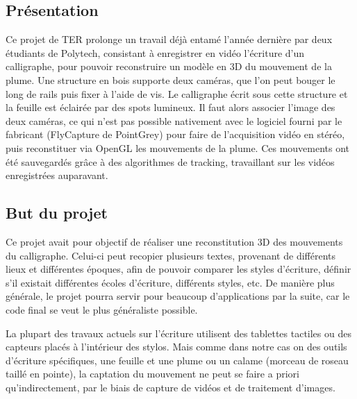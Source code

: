 \subsection{Présentation}

Ce projet de TER prolonge un travail déjà entamé l'année dernière par deux étudiants de Polytech, consistant à enregistrer en vidéo l'écriture d'un calligraphe, pour pouvoir reconstruire un modèle en 3D du mouvement de la plume. Une structure en bois supporte deux caméras, que l'on peut bouger le long de rails puis fixer à l'aide de vis. Le calligraphe écrit sous cette structure et la feuille est éclairée par des spots lumineux. Il faut alors associer l'image des deux caméras, ce qui n'est pas possible nativement avec le logiciel fourni par le fabricant (FlyCapture de PointGrey) pour faire de l'acquisition vidéo en stéréo, puis reconstituer via OpenGL les mouvements de la plume. Ces mouvements ont été sauvegardés grâce à des algorithmes de tracking, travaillant sur les vidéos enregistrées auparavant.



\subsection{But du projet}

Ce projet avait pour objectif de réaliser une reconstitution 3D des mouvements du calligraphe. Celui-ci peut recopier plusieurs textes, provenant de différents lieux et différentes époques, afin de pouvoir comparer les styles d'écriture, définir s'il existait différentes écoles d'écriture, différents styles, etc. De manière plus générale, le projet pourra servir pour beaucoup d'applications par la suite, car le code final se veut le plus généraliste possible.

La plupart des travaux actuels sur l'écriture utilisent des tablettes tactiles ou des capteurs placés à l'intérieur des stylos. Mais comme dans notre cas on des outils d'écriture spécifiques, une feuille et une plume ou un calame (morceau de roseau taillé en pointe), la captation du mouvement ne peut se faire a priori qu'indirectement, par le biais de capture de vidéos et de traitement d'images.